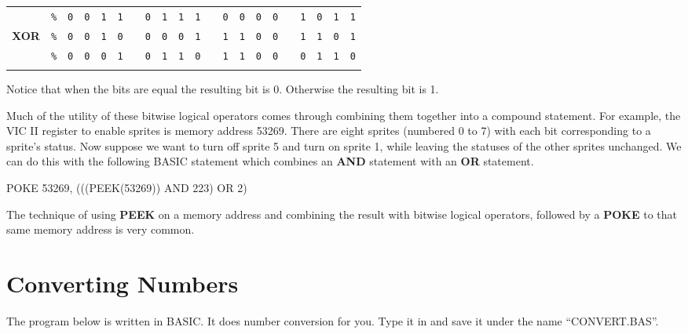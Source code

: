 \begin{center}
	\begin{tabular}{ccccccccccccccccccccc}
	  & \texttt{\%} & \texttt{0} & \texttt{0} & \texttt{1} & \texttt{1} & & \texttt{0} & \texttt{1} & \texttt{1} & \texttt{1} & & \texttt{0} & \texttt{0} & \texttt{0} & \texttt{0} & & \texttt{1} & \texttt{0} & \texttt{1} & \texttt{1} \\
	  {\bf XOR} & \texttt{\%} & \texttt{0} & \texttt{0} & \texttt{1} & \texttt{0} & &  \texttt{0} & \texttt{0} & \texttt{0} & \texttt{1} &  & \texttt{1} & \texttt{1} & \texttt{0} & \texttt{0} & & \texttt{1} & \texttt{1} & \texttt{0} & \texttt{1} \\ \hline
	  & \texttt{\%} & \texttt{0} & \texttt{0} & \texttt{0} & \texttt{1} & & \texttt{0} & \texttt{1} & \texttt{1} & \texttt{0} & &  \texttt{1} & \texttt{1} & \texttt{0} & \texttt{0} & & \texttt{0} & \texttt{1} & \texttt{1} & \texttt{0} \\ \hhline{=====================}
	  \end{tabular}
\end{center}

Notice that when the bits are equal the resulting bit is 0. Otherwise the resulting bit is 1.

Much of the utility of these bitwise logical operators comes through combining them together into a compound statement. For example, the VIC II register to enable sprites is memory address 53269. There are eight sprites (numbered 0 to 7) with each bit corresponding to a sprite's status. Now suppose we want to turn off sprite 5 and turn on sprite 1, while leaving the statuses of the other sprites unchanged. We can do this with the following BASIC statement which combines an {\bf AND} statement with an {\bf OR} statement.
\begin{screenoutput}
POKE 53269, (((PEEK(53269)) AND 223) OR 2)
\end{screenoutput}

The technique of using {\bf PEEK} on a memory address and combining the result with bitwise logical operators, followed by a {\bf POKE} to that same memory address is very common.

\section{Converting Numbers}

The program below is written in BASIC. It does number conversion for you. Type it in and save it under the name ``CONVERT.BAS''.

